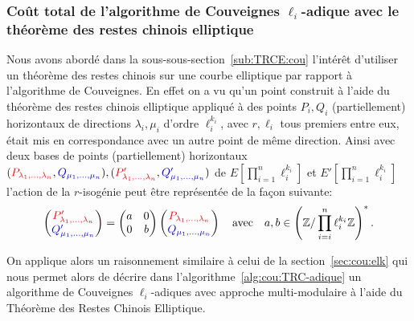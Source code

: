 \documentclass[10pt,a4paper]{book}
\theoremstyle{plain}
\theoremstyle{definition}
\theoremstyle{definition}
\theoremstyle{definition}
\theoremstyle{definition}
\theoremstyle{remark}
\theoremstyle{remark}
\theoremstyle{definition}
\begin{document}
\subsubsection{Coût total de l'algorithme de Couveignes $\ell_i$-adique avec le théorème des restes chinois elliptique}
Nous avons abordé dans la sous-sous-section~\ref{sub:TRCE:cou} l'intérêt 
d'utiliser un théorème des restes chinois sur une courbe elliptique par rapport
à l'algorithme de Couveignes. En effet on a vu qu'un point construit à l'aide 
du théorème des restes chinois elliptique appliqué à des points $P_i,Q_i$ 
(partiellement) horizontaux de directions $\lambda_i,\mu_i$  d'ordre 
$\ell_i^{k_i}$, avec $r, \ell_i$ tous premiers entre eux, 
était mis en correspondance avec un autre point de même direction.
Ainsi avec deux bases de points (partiellement) horizontaux $(\color{red}P_{\lambda_1,
 \dots, \lambda_n}\color{black},\color{blue}Q_{\mu_1, \dots, 
 \mu_n}\color{black}),(\color{red}P'_{\lambda_1, \dots, \lambda_n}\color{black}
 ,\color{blue}
 Q'_{\mu_1, \dots, \mu_n}\color{black})$ de $E[\prod_{i=1}^n\ell_i^{k_i}]$ et 
 $E'[\prod_{i=1}^n\ell_i^{k_i}]$ l'action de la $r$-isogénie peut être 
 représentée de la façon suivante:  
 \begin{equation*}
\left(
\begin{matrix}
\color{red} P'_{\lambda_1,
 \dots, \lambda_n} \\
\color{blue} Q'_{\mu_1, \dots, 
 \mu_n} \color{black}
\end{matrix}
\right)= \left(\begin{matrix}
a & 0 \\
0 & b
\end{matrix} \right)
\left(
\begin{matrix}
\color{red} P_{\lambda_1, 
\dots, \lambda_n} \\
\color{blue} Q_{\mu_1, \dots, 
 \mu_n} \color{black}
\end{matrix}
\right)
\quad \text{avec} \quad a,b \in \left( \mathbb{Z}/\prod_{i=i}^n\ell_i^{k_i}\mathbb{Z} \right)^*.
\end{equation*}
 
On applique alors un raisonnement similaire à celui de la 
section~\ref{sec:cou:elk} qui nous permet alors de décrire dans 
l'algorithme~\ref{alg:cou:TRC-adique} un algorithme de Couveignes 
$\ell_i$-adiques avec approche multi-modulaire à l'aide du Théorème des Restes 
Chinois Elliptique.
 
\end{document}
